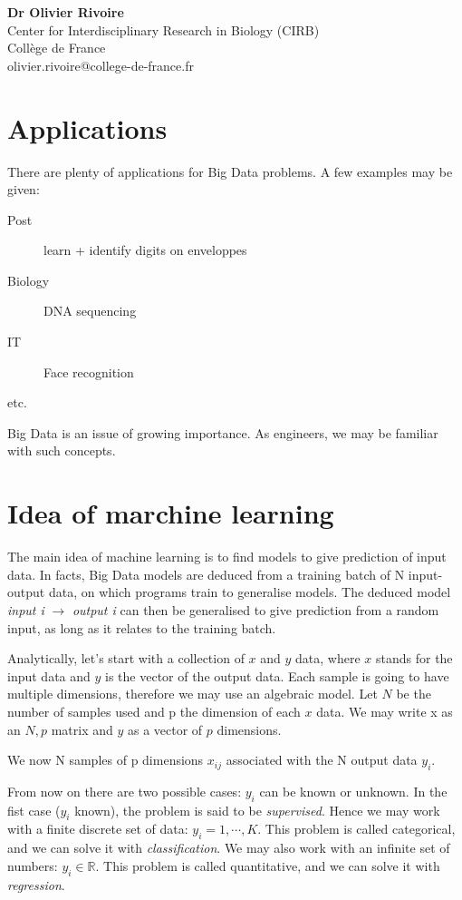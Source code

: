 \documentclass[a4paper]{tufte-book}
\begin{document}
\textbf{Dr Olivier Rivoire}\\
Center for Interdisciplinary Research in Biology (CIRB)\\
Collège de France\\
olivier.rivoire@college-de-france.fr\\

\section*{Applications}

There are plenty of applications for Big Data problems. A few examples may be
given:
\begin{description}
    \item[Post] learn + identify digits on enveloppes
    \item[Biology] DNA sequencing
    \item[IT] Face recognition
    \item[etc.]
\end{description}

Big Data is an issue of growing importance. As engineers, we may be familiar 
with such concepts.
 \section*{Idea of marchine learning} 

The main idea of machine learning is to find models to give prediction of input data.
In facts, Big Data models are deduced from a training batch of N input-output
data, on which programs train to generalise models.
The deduced model \emph{input i} $\rightarrow$ \emph{output i} can then be
generalised to give prediction from a random input, as long as it relates to 
the training batch.



Analytically, let's start with a collection of $x$ and $y$ data, where $x$ 
stands for the input data and $y$ is the vector of the output data.
Each sample is going to have multiple dimensions, therefore we may use an
algebraic model. Let $N$ be the number of samples used and p the dimension of
each $x$ data. We may write x as an $N,p$ matrix and $y$ as a vector of $p$
dimensions.

We now N samples of p dimensions $x_{ij}$ associated with the N output data
$y_i$.

From now on there are two possible cases: $y_i$ can be known or unknown.
In the fist case ($y_i$ known), the problem is said to be \emph{supervised}.
Hence we may work with a finite discrete set of data: $y_i = 1, \cdots, K$.
This problem is called categorical, and we can solve it with 
\emph{classification}.
We may also work with an infinite set of numbers: $y_i \in \mathbb{R}$. This
problem is called quantitative, and we can solve it with \emph{regression}.
\end{document}

